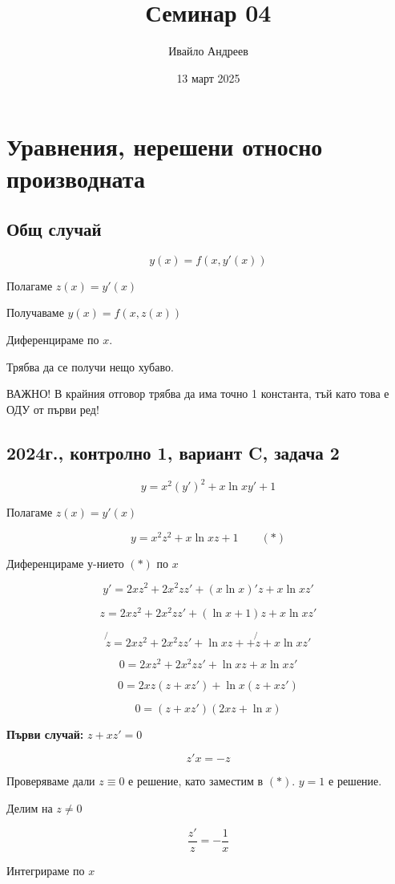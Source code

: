 \documentclass{scrartcl}
\title{Семинар 04}
\author{Ивайло Андреев}
\date{13 март 2025}
\begin{document}
\maketitle  %

\section{Уравнения, нерешени относно производната}

\subsection{Общ случай}

$$y(x) = f(x, y'(x))$$

Полагаме $z(x) = y'(x)$

Получаваме $y(x) = f(x, z(x))$

Диференцираме по $x$.

Трябва да се получи нещо хубаво.

ВАЖНО! В крайния отговор трябва да има точно 1 константа, тъй като това е ОДУ от първи ред!

\subsection{2024г., контролно 1, вариант C, задача 2}

$$y = x^2(y')^2+x\ln{x}y'+1$$

Полагаме $z(x)=y'(x)$

$$y=x^2z^2+x\ln{x}z+1\qquad (*)$$

Диференцираме у-нието $(*)$ по $x$

$$y'=2xz^2+2x^2zz'+(x\ln{x})'z+x\ln{x}z'$$

$$z=2xz^2+2x^2zz'+(\ln{x}+1)z+x\ln{x}z'$$

$$\not{z}=2xz^2+2x^2zz'+\ln{x}z++\not{z}+x\ln{x}z'$$

$$0=2xz^2+2x^2zz'+\ln{x}z+x\ln{x}z'$$

$$0=2xz(z+xz')+\ln{x}(z+xz')$$

$$0=(z+xz')(2xz+\ln{x})$$

\textbf{Първи случай:} $z+xz'=0$

$$z'x=-z$$

Проверяваме дали $z\equiv 0$ е решение, като заместим в $(*)$. $y=1$ е решение.

Делим на $z\ne 0$

$$\dfrac{z'}{z} = -\dfrac{1}{x}$$

Интегрираме по $x$
\end{document}

